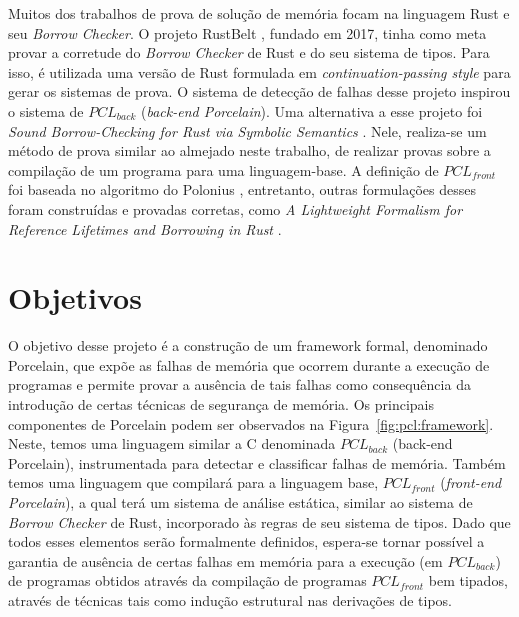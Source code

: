 Muitos dos trabalhos de prova de solução de memória focam na linguagem Rust e seu \emph{Borrow Checker}. O projeto RustBelt \cite{RUSTBELT}, fundado em 2017, tinha como meta provar a corretude do \emph{Borrow Checker} de Rust e do seu sistema de tipos. Para isso, é utilizada uma versão de Rust formulada em \emph{continuation-passing style} para gerar os sistemas de prova. O sistema de detecção de falhas desse projeto inspirou o sistema de $PCL_{back}$ (\emph{back-end Porcelain}). Uma alternativa a esse projeto foi \emph{Sound Borrow-Checking for Rust via Symbolic Semantics} \cite{RUSTSYMBOLIC}. Nele, realiza-se um método de prova similar ao almejado neste trabalho, de realizar provas sobre a compilação de um programa para uma linguagem-base. A definição de $PCL_{front}$ foi baseada no algoritmo do Polonius \cite{Stjerna1684081}, entretanto, outras formulações desses foram construídas e provadas corretas, como \emph{A Lightweight Formalism for Reference Lifetimes and Borrowing in Rust} \cite{RUSTFORMALISM}. 

\section{Objetivos}

O objetivo desse projeto é a construção de um framework formal, denominado Porcelain,  que expõe as falhas de memória que ocorrem durante a execução de programas e permite provar a ausência de tais falhas como consequência da introdução de certas técnicas de segurança de memória. Os principais componentes de Porcelain podem ser observados na Figura~\ref{fig:pcl:framework}. Neste, temos uma linguagem similar a C denominada $PCL_{back}$ (back-end Porcelain), instrumentada para detectar e classificar falhas de memória. Também temos uma linguagem que compilará para a linguagem base, $PCL_{front}$ (\emph{front-end Porcelain}), a qual terá um sistema de análise estática, similar ao sistema de \emph{Borrow Checker} de Rust, incorporado às regras de seu sistema de tipos. Dado que todos esses elementos serão formalmente definidos, espera-se tornar possível a garantia de ausência de certas falhas em memória para a execução (em $PCL_{back}$) de programas obtidos através da compilação de programas  $PCL_{front}$ bem tipados, através de técnicas tais como indução estrutural nas derivações de tipos. 

